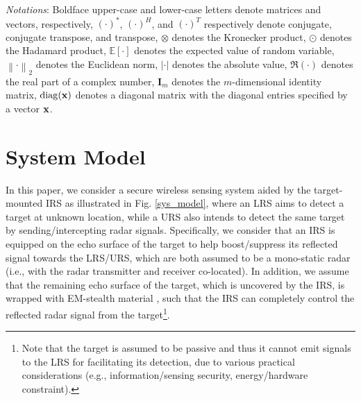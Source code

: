 \documentclass[10pt,final,doublecolumn]{IEEEtran}
\begin{document}
\emph{Notations}: Boldface upper-case and lower-case letters denote
matrices and vectors, respectively, $(\cdot)^*$, $(\cdot)^H$, and $(\cdot)^T$  respectively denote conjugate, conjugate transpose, and transpose, $\otimes$ denotes the Kronecker product, $\odot$ denotes the Hadamard product, $\mathbb{E}[\cdot]$ denotes the expected value of
random variable, $\left \|\cdot\right \|_2$ denotes the Euclidean norm, $|\cdot|$ denotes the absolute value, $\Re(\cdot)$ denotes the real part of a complex number, $\mathbf{I}_{m}$ denotes the $m$-dimensional identity matrix, $\mathrm{diag}({\bf x})$ denotes a diagonal matrix with the diagonal entries specified by a vector ${\bf x}$.

\section{System Model}
In this paper, we consider a secure wireless sensing system aided by the target-mounted IRS as illustrated in Fig. \ref{sys_model}, where an LRS aims to detect a target at unknown location, while a URS also intends to detect  the same target by sending/intercepting radar signals. Specifically, we consider that an IRS is equipped on the echo surface of the target to help boost/suppress its reflected signal towards the LRS/URS, which are both assumed to be a mono-static radar (i.e., with the radar transmitter and receiver co-located). In addition, we assume that the remaining echo surface of the target, which is uncovered by the IRS, is
wrapped with EM-stealth material \cite{stealth}, such that the IRS can completely control the reflected radar signal from the target\footnote{Note that the target is assumed to be passive and thus it cannot emit signals to the LRS for facilitating its detection, due to various practical considerations (e.g., information/sensing security, energy/hardware  constraint).}.
\end{document}
